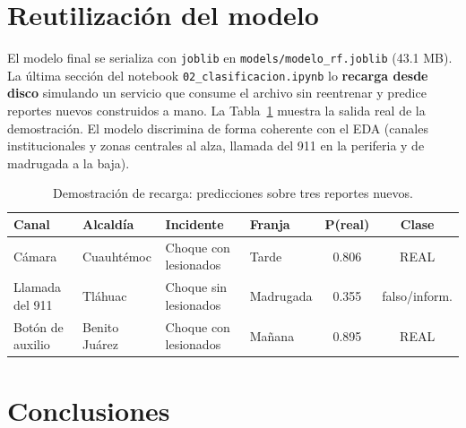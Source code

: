 \documentclass[11pt,letterpaper]{article}
\begin{document}
\section{Reutilización del modelo}
\label{sec:reuso}

El modelo final se serializa con \texttt{joblib} en
\texttt{models/modelo\_rf.joblib} (43.1 MB). La última sección del notebook
\texttt{02\_clasificacion.ipynb} lo \textbf{recarga desde disco} simulando un
servicio que consume el archivo sin reentrenar y predice reportes nuevos
construidos a mano. La Tabla~\ref{tab:demo} muestra la salida real de la
demostración. El modelo discrimina de forma coherente con el EDA (canales
institucionales y zonas centrales al alza, llamada del 911 en la periferia y
de madrugada a la baja).

\begin{table}[H]
\centering
\caption{Demostración de recarga: predicciones sobre tres reportes nuevos.}
\label{tab:demo}
\small
\begin{tabular}{@{}llllcc@{}}
\toprule
\textbf{Canal} & \textbf{Alcaldía} & \textbf{Incidente} & \textbf{Franja} & \textbf{P(real)} & \textbf{Clase}\\
\midrule
Cámara           & Cuauhtémoc    & Choque con lesionados & Tarde     & 0.806 & REAL\\
Llamada del 911  & Tláhuac       & Choque sin lesionados & Madrugada & 0.355 & falso/inform.\\
Botón de auxilio & Benito Juárez & Choque con lesionados & Mañana    & 0.895 & REAL\\
\bottomrule
\end{tabular}
\end{table}

\section{Conclusiones}
\end{document}
